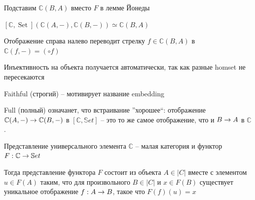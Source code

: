 \documentclass[
  russian,
  aspectratio=169,
  xcolor={svgnames},
  hyperref={colorlinks,citecolor=DeepPink4,linkcolor=DarkRed,urlcolor=DarkBlue}]{beamer}
\begin{document}
\newcommand{\boundellipse}[3]%
{(#1) ellipse (#2 and #3)
}

\begin{frame}[fragile]
\begin{minipage}{0.3\textwidth}
  \begin{figure}%
  \end{figure}
\end{minipage}
\begin{minipage}{0.65\textwidth}
Подставим $\mathbb{C}(B, A)$ вместо $F$ в лемме Йонеды
\begin{center}
$ [\mathbb{C}, \operatorname{Set}](\mathbb{C}(A,-), \mathbb{C}(B,-)) \simeq \mathbb{C}(B, A) $  
\end{center}
Отображение справа налево переводит стрелку 
$f\in \mathbb{C}(B, A)$ в $\mathbb{C}(f,-)=(\circ f)$
\vspace{0.5cm}

Инъективность на объекта получается автоматически, так как разные homset не пересекаются
\vspace{0.5cm}

Faithful (строгий) -- мотивирует название embedding
\vspace{0.5cm}

Full (полный) означанет, что встраивание ''хорошее``:
отображение $\mathbb{C}(A,-) \rightarrow \mathbb{C}(B,-)$ в $[\mathbb{C},\mathbb{S}et]$ -- это то же самое отображение, что и $B\rightarrow A$ в $\mathbb{C}$.

\end{minipage}
\end{frame}


\begin{frame}[fragile]{Представление универсального элемента}
$\mathbb{C} $ -- малая категория и функтор $F:\mathbb{C}\rightarrow \mathbb{S}et$\vspace{0.5cm}

Тогда представление функтора $F$ состоит из объекта $A\in|C|$ вместе с элементом $u \in F(A)$ таким, что
для произвольного $B\in |C|$ и $x\in F(B)$ существует уникальное отображение $f:A\rightarrow B$, такое что $F(f)(u)=x$
\end{frame}
\end{document}
